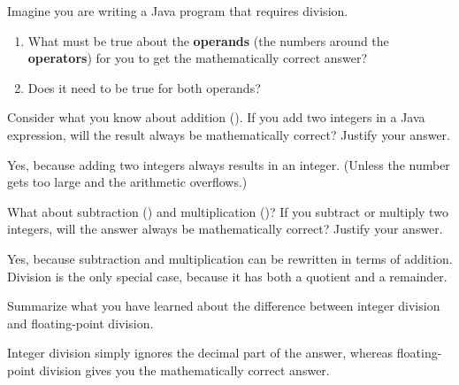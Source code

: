 \Q Imagine you are writing a Java program that requires division.

\begin{enumerate}

\item What must be true about the \textbf{operands} (the numbers around the \textbf{operators}) for you to get the mathematically correct answer?


\item Does it need to be true for both operands? 

\end{enumerate}


\Q Consider what you know about addition (\java{+}).
If you add two integers in a Java expression, will the result always be mathematically correct?
Justify your answer.

\begin{answer}[5em]
Yes, because adding two integers always results in an integer.
(Unless the number gets too large and the arithmetic overflows.)
\end{answer}


\Q What about subtraction (\java{-}) and multiplication (\java{*})? If you subtract or multiply two integers, will the answer always be mathematically correct? Justify your answer.

\begin{answer}[5em]
Yes, because subtraction and multiplication can be rewritten in terms of addition.
Division is the only special case, because it has both a quotient and a remainder.
\end{answer}


\Q Summarize what you have learned about the difference between integer division and floating-point division.

\begin{answer}[5em]
Integer division simply ignores the decimal part of the answer, whereas floating-point division gives you the mathematically correct answer.
\end{answer}
